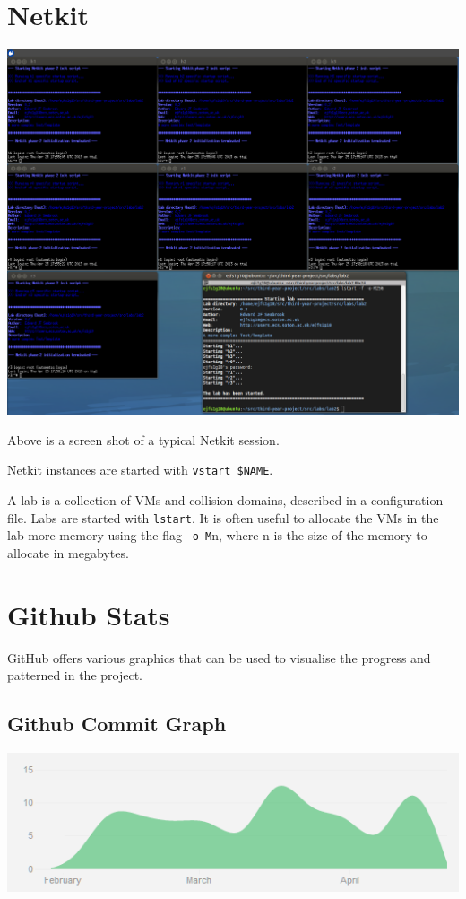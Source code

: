 \chapter{Netkit}
\begin{center}
	\includegraphics[width=\linewidth]{../Diagrams/Netkit/NetkitScreenshot.png}
\end{center}

Above is a screen shot of a typical Netkit session.  

Netkit instances are started with \texttt{vstart \$NAME}.

A lab is a collection of VMs and collision domains, described in a
configuration file. Labs are started with \texttt{lstart}. It is often useful
to allocate the VMs in the lab more memory using the flag \texttt{-o-M}n, where
n is the size of the memory to allocate in megabytes.

\chapter{Github Stats}
\label{GithubStats}
GitHub offers various graphics that can be used to visualise the progress and
patterned in the project. 

\section{Github Commit Graph}
\begin{center}
	\includegraphics[width=\linewidth]{../Diagrams/Stats/GitHubCommitGraph.png}
\end{center}

